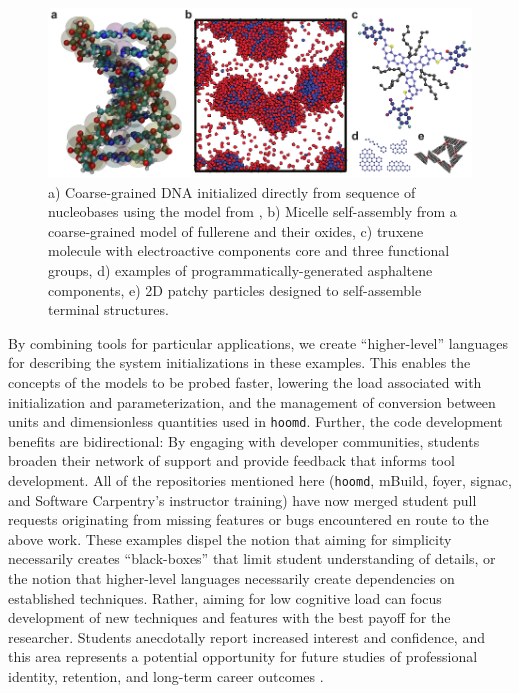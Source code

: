 \begin{figure}
    \centering
    \includegraphics[width=6in]{figures/pub4/mBuild.pdf}
    \caption{a) Coarse-grained DNA initialized directly from sequence of nucleobases using the model from \cite{Knotts2007}, b) Micelle self-assembly from a coarse-grained model of fullerene and their oxides, c) truxene molecule with electroactive components core and three functional groups, d) examples of programmatically-generated asphaltene components, e) 2D patchy particles designed to self-assemble terminal structures.}\label{fig:mbuild} %
\end{figure}

By combining tools for particular applications, we create ``higher-level'' languages for describing the system initializations in these examples.
This enables the concepts of the models to be probed faster, lowering the load associated with initialization and parameterization, and the management of conversion between units and dimensionless quantities used in \texttt{hoomd}. 
Further, the code development benefits are bidirectional: By engaging with developer communities, students broaden their network of support and provide feedback that informs tool development.
All of the repositories mentioned here (\texttt{hoomd}, mBuild, foyer, signac, and Software Carpentry's instructor training) have now merged student pull requests originating from missing features or bugs encountered en route to the above work.
These examples dispel the notion that aiming for simplicity necessarily creates ``black-boxes'' that limit student understanding of details, or the notion that higher-level languages necessarily create dependencies on established techniques.
Rather, aiming for low cognitive load can focus development of new techniques and features with the best payoff for the researcher.
Students anecdotally report increased interest and confidence, and this area represents a potential opportunity for future studies of professional identity, retention, and long-term career outcomes \cite{Ibarra1999}.

